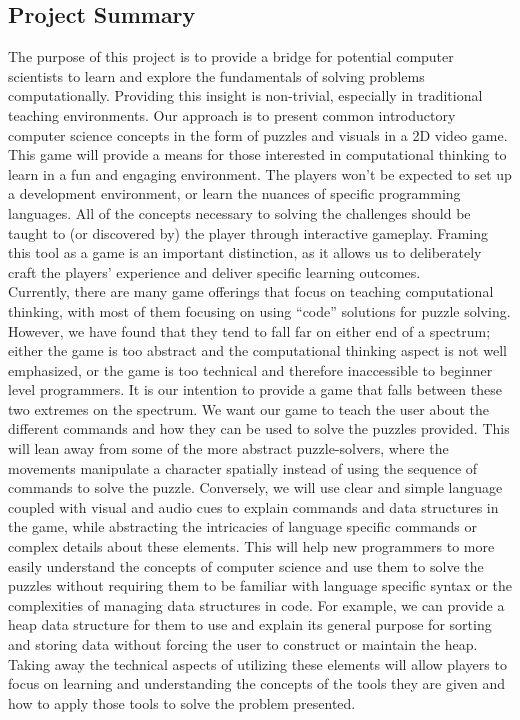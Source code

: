 \subsection{Project Summary}
The purpose of this project is to provide a bridge for potential computer
scientists to learn and explore the fundamentals of solving problems
computationally. Providing this insight is non-trivial, especially in
traditional teaching environments. Our approach is to present common
introductory computer science concepts in the form of puzzles and visuals in a
2D video game. This game will provide a means for those interested in
computational thinking to learn in a fun and engaging environment. The players
won’t be expected to set up a development environment, or learn the nuances of
specific programming languages. All of the concepts necessary to solving the
challenges should be taught to (or discovered by) the player through interactive
gameplay. Framing this tool as a game is an important distinction, as it allows
us to deliberately craft the players’ experience and deliver specific learning
outcomes.\\

Currently, there are many game offerings that focus on teaching computational
thinking, with most of them focusing on using “code” solutions for puzzle
solving. However, we have found that they tend to fall far on either end of a
spectrum; either the game is too abstract and the computational thinking aspect
is not well emphasized, or the game is too technical and therefore inaccessible
to beginner level programmers. It is our intention to provide a game that falls
between these two extremes on the spectrum. We want our game to teach the user
about the different commands and how they can be used to solve the puzzles
provided. This will lean away from some of the more abstract puzzle-solvers,
where the movements manipulate a character spatially instead of using the
sequence of commands to solve the puzzle. Conversely, we will use clear and
simple language coupled with visual and audio cues to explain commands and data
structures in the game, while abstracting the intricacies of language specific
commands or complex details about these elements. This will help new programmers
to more easily understand the concepts of computer science and use them to solve
the puzzles without requiring them to be familiar with language specific syntax
or the complexities of managing data structures in code. For example, we can
provide a heap data structure for them to use and explain its general purpose
for sorting and storing data without forcing the user to construct or maintain
the heap. Taking away the technical aspects of utilizing these elements will
allow players to focus on learning and understanding the concepts of the tools 
they are given and how to apply those tools to solve the problem presented.


